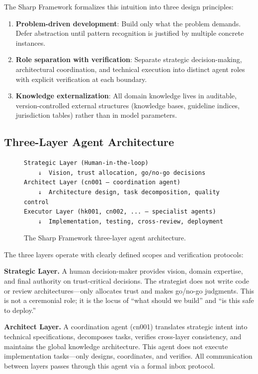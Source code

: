 \documentclass[11pt]{article}
\begin{document}
The Sharp Framework formalizes this intuition into three design principles:

\begin{enumerate}[leftmargin=*]
    \item \textbf{Problem-driven development}: Build only what the problem 
    demands. Defer abstraction until pattern recognition is justified by 
    multiple concrete instances.
    \item \textbf{Role separation with verification}: Separate strategic 
    decision-making, architectural coordination, and technical execution 
    into distinct agent roles with explicit verification at each boundary.
    \item \textbf{Knowledge externalization}: All domain knowledge lives 
    in auditable, version-controlled external structures (knowledge bases, 
    guideline indices, jurisdiction tables) rather than in model parameters.
\end{enumerate}

\subsection{Three-Layer Agent Architecture}

\begin{figure}[h]
\centering
\begin{verbatim}
Strategic Layer (Human-in-the-loop)
    ↓  Vision, trust allocation, go/no-go decisions
Architect Layer (cn001 — coordination agent)
    ↓  Architecture design, task decomposition, quality control
Executor Layer (hk001, cn002, ... — specialist agents)
    ↓  Implementation, testing, cross-review, deployment
\end{verbatim}
\caption{The Sharp Framework three-layer agent architecture.}
\label{fig:three-layer}
\end{figure}

The three layers operate with clearly defined scopes and verification 
protocols:

\textbf{Strategic Layer.} A human decision-maker provides vision, domain 
expertise, and final authority on trust-critical decisions. The strategist 
does not write code or review architectures---only allocates trust and 
makes go/no-go judgments. This is not a ceremonial role; it is the 
locus of ``what should we build'' and ``is this safe to deploy.''

\textbf{Architect Layer.} A coordination agent (cn001) translates strategic 
intent into technical specifications, decomposes tasks, verifies 
cross-layer consistency, and maintains the global knowledge architecture. 
This agent does not execute implementation tasks---only designs, coordinates, 
and verifies. All communication between layers passes through this agent 
via a formal inbox protocol.
\end{document}
